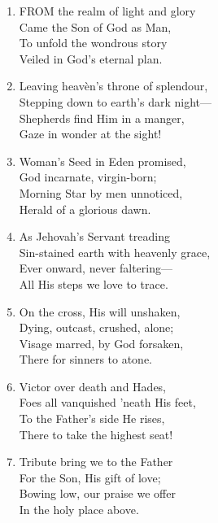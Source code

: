 \begin{enumerate}
    \item FROM the realm of light and glory \\
        Came the Son of God as Man, \\
        To unfold the wondrous story \\
        Veiled in God's eternal plan.

    \item Leaving heav\`en's throne of splendour, \\
        Stepping down to earth's dark night--- \\
        Shepherds find Him in a manger, \\
        Gaze in wonder at the sight!

    \item Woman's Seed in Eden promised, \\
        God incarnate, virgin-born; \\
        Morning Star by men unnoticed, \\
        Herald of a glorious dawn.

    \item As Jehovah's Servant treading \\
        Sin-stained earth with heavenly grace, \\
        Ever onward, never faltering--- \\
        All His steps we love to trace.

    \item On the cross, His will unshaken, \\
        Dying, outcast, crushed, alone; \\
        Visage marred, by God forsaken, \\
        There for sinners to atone.

    \item Victor over death and Hades, \\
        Foes all vanquished 'neath His feet, \\
        To the Father's side He rises, \\
        There to take the highest seat!

    \item Tribute bring we to the Father \\
        For the Son, His gift of love; \\
        Bowing low, our praise we offer \\
        In the holy place above.

\end{enumerate}

